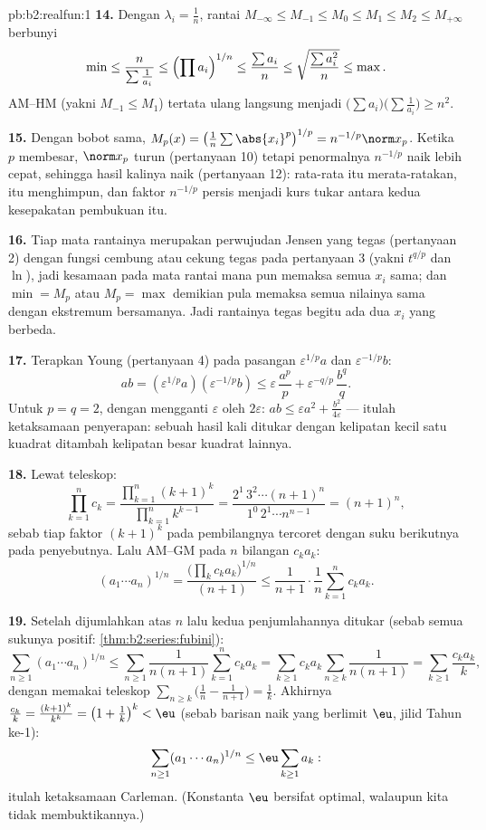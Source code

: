 \begin{solution}{pb:b2:realfun:1}
\textbf{14.} Dengan $\lambda_i = \frac1n$, rantai $M_{-\infty}
\leq M_{-1} \leq M_0 \leq M_1 \leq M_2 \leq M_{+\infty}$ berbunyi
\[
\min \leq \frac{n}{\sum\frac1{a_i}} \leq \Bigl(\prod
a_i\Bigr)^{1/n} \leq \frac{\sum a_i}{n} \leq
\sqrt{\frac{\sum a_i^2}{n}} \leq \max .
\]
AM--HM (yakni $M_{-1} \leq M_1$) tertata ulang langsung menjadi
$\bigl(\sum a_i\bigr)\bigl(\sum\frac1{a_i}\bigr) \geq n^2$.

\textbf{15.} Dengan bobot sama, $M_p(x) =
\bigl(\frac1n\sum\abs{x_i}^p\bigr)^{1/p} = n^{-1/p}\norm x_p$.
Ketika $p$ membesar, $\norm x_p$ turun (pertanyaan 10) tetapi
penormalnya $n^{-1/p}$ naik lebih cepat, sehingga hasil kalinya
naik (pertanyaan 12): rata-rata itu merata-ratakan,  itu
menghimpun, dan faktor $n^{-1/p}$ persis menjadi kurs tukar antara
kedua kesepakatan pembukuan itu.

\textbf{16.} Tiap mata rantainya merupakan perwujudan Jensen yang tegas
(pertanyaan 2) dengan fungsi cembung atau cekung tegas pada
pertanyaan 3 (yakni $t^{q/p}$ dan $\ln$), jadi kesamaan pada mata rantai
mana pun memaksa semua $x_i$ sama; dan $\min = M_p$ atau $M_p = \max$
demikian pula memaksa semua nilainya sama dengan ekstremum bersamanya.
Jadi rantainya tegas begitu ada dua $x_i$ yang berbeda.

\textbf{17.} Terapkan Young (pertanyaan 4) pada pasangan
$\varepsilon^{1/p}a$ dan $\varepsilon^{-1/p}b$:
\[
ab = (\varepsilon^{1/p}a)(\varepsilon^{-1/p}b)
\leq \varepsilon\,\frac{a^p}p +
\varepsilon^{-q/p}\,\frac{b^q}q .
\]
Untuk $p = q = 2$, dengan mengganti $\varepsilon$ oleh $2\varepsilon$:
$ab \leq \varepsilon a^2 + \frac{b^2}{4\varepsilon}$ --- itulah
ketaksamaan penyerapan: sebuah hasil kali ditukar dengan kelipatan kecil
satu kuadrat ditambah kelipatan besar kuadrat lainnya.

\textbf{18.} Lewat teleskop:
\[
\prod_{k=1}^{n}c_k = \frac{\prod_{k=1}^n(k+1)^k}
{\prod_{k=1}^{n}k^{k-1}}
= \frac{2^1\,3^2\cdots(n+1)^n}{1^0\,2^1\cdots n^{n-1}}
= (n+1)^n,
\]
sebab tiap faktor $(k+1)^k$ pada pembilangnya tercoret dengan
suku berikutnya pada penyebutnya. Lalu AM--GM pada $n$ bilangan $c_ka_k$:
\[
(a_1\cdots a_n)^{1/n} =
\frac{\bigl(\prod_k c_ka_k\bigr)^{1/n}}{(n+1)}
\leq \frac{1}{n+1}\cdot\frac1n\sum_{k=1}^{n}c_ka_k .
\]

\textbf{19.} Setelah dijumlahkan atas $n$ lalu kedua penjumlahannya
ditukar (sebab semua sukunya positif: \cref{thm:b2:series:fubini}):
\[
\sum_{n\geq1}(a_1\cdots a_n)^{1/n}
\leq \sum_{n\geq1}\frac{1}{n(n+1)}\sum_{k=1}^{n}c_ka_k
= \sum_{k\geq1}c_ka_k\sum_{n\geq k}\frac1{n(n+1)}
= \sum_{k\geq1}\frac{c_ka_k}{k},
\]
dengan memakai teleskop $\sum_{n\geq k}\bigl(\frac1n -
\frac1{n+1}\bigr) = \frac1k$. Akhirnya $\frac{c_k}k =
\frac{(k+1)^k}{k^k} = \bigl(1 + \frac1k\bigr)^k < \eu$
(sebab barisan naik yang berlimit $\eu$, jilid Tahun ke-1):
\[
\sum_{n\geq1}(a_1\cdots a_n)^{1/n} \leq
\eu\sum_{k\geq1}a_k :
\]
itulah ketaksamaan Carleman. (Konstanta $\eu$ bersifat optimal, walaupun
kita tidak membuktikannya.)


\end{solution}
